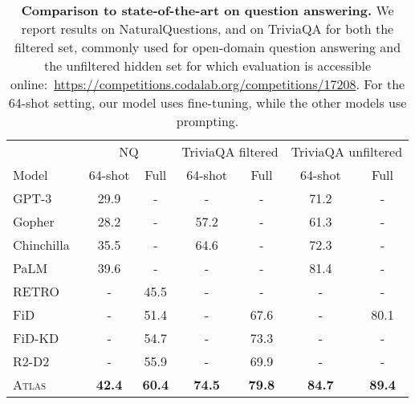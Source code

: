 \documentclass[10pt]{article} \usepackage[preprint]{tmlr}
\newcommand{\Atlas}{\textsc{Atlas}}
\begin{document}
\begin{table}[t]
  \centering
  \caption{\textbf{Comparison to state-of-the-art on question answering.} 
    We report results on NaturalQuestions, and on TriviaQA for both the filtered set, commonly used for open-domain question answering and the unfiltered hidden set for which evaluation is accessible online:~\small\url{https://competitions.codalab.org/competitions/17208}\normalsize. 
    For the 64-shot setting, our model uses fine-tuning, while the other models use prompting.
   }
  \label{table:nq_sota}
  \vspace{0.5em}
  \begin{tabular}{l cc cc cc}
    \toprule
    & \multicolumn{2}{c}{NQ} & \multicolumn{2}{c}{TriviaQA filtered} & \multicolumn{2}{c}{TriviaQA unfiltered}\\
    \cmidrule(lr){2-3} \cmidrule(lr){4-5} \cmidrule(lr){6-7} 
    Model & 64-shot & Full & 64-shot & Full & 64-shot & Full \\
    \midrule
    GPT-3~\citep{brown2020gpt3}      & 29.9 & - &  -   & - & 71.2 & - \\
    Gopher~\citep{rae2021goepher}     & 28.2 & - & 57.2 & - & 61.3 & - \\
    Chinchilla~\citep{hoffmann2022chinchilla} & 35.5 & - & 64.6 & - & 72.3 & - \\
    PaLM~\citep{chowdhery2022palm}       & 39.6 & - &  -   & - & 81.4 & -\\
    RETRO~\citep{borgeaud2021retro}      & - & 45.5 &  -   & - & -    & -\\
    FiD~\citep{izacard2020leveraging}        & - & 51.4 & -    & 67.6 & - & 80.1 \\
    FiD-KD~\citep{izacard2021distilling}     & - & 54.7 &  -   & 73.3 & - & - \\
    R2-D2~\citep{fajcik2021r2d2} & - & 55.9 & -    & 69.9 & - & - \\
    \Atlas       & \textbf{42.4} & \textbf{60.4} & \textbf{74.5} & \textbf{79.8} & \textbf{84.7} & \textbf{89.4} \\
    \bottomrule
  \end{tabular}
\end{table}
\end{document}
